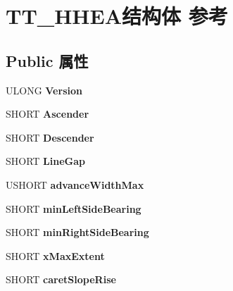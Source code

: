 \hypertarget{struct_t_t___h_h_e_a}{}\section{T\+T\+\_\+\+H\+H\+E\+A结构体 参考}
\label{struct_t_t___h_h_e_a}
\subsection*{Public 属性}
\begin{DoxyCompactItemize}
\item 
\mbox{\label{struct_t_t___h_h_e_a_aa05505bc2dbfb31e5d1ca99575117235}} 
U\+L\+O\+NG {\bfseries Version}
\item 
\mbox{\label{struct_t_t___h_h_e_a_ae5445ccf10168a3bcb59230cc2b16dd6}} 
S\+H\+O\+RT {\bfseries Ascender}
\item 
\mbox{\label{struct_t_t___h_h_e_a_ac67ecef4c132eb16403cd321e7b877a3}} 
S\+H\+O\+RT {\bfseries Descender}
\item 
\mbox{\label{struct_t_t___h_h_e_a_ab4bcb0aa017cf1fac9c29605d58df27b}} 
S\+H\+O\+RT {\bfseries Line\+Gap}
\item 
\mbox{\label{struct_t_t___h_h_e_a_a1d0ad53d8d77bb148c3cbeb66a2805a9}} 
U\+S\+H\+O\+RT {\bfseries advance\+Width\+Max}
\item 
\mbox{\label{struct_t_t___h_h_e_a_ab096904369a6c9ac0a6bb9c4cdf041e0}} 
S\+H\+O\+RT {\bfseries min\+Left\+Side\+Bearing}
\item 
\mbox{\label{struct_t_t___h_h_e_a_a5ca8613d86979ba5adf11b6d400e005d}} 
S\+H\+O\+RT {\bfseries min\+Right\+Side\+Bearing}
\item 
\mbox{\label{struct_t_t___h_h_e_a_a2656b631b409f8da3f2c56b4979861aa}} 
S\+H\+O\+RT {\bfseries x\+Max\+Extent}
\item 
\mbox{\label{struct_t_t___h_h_e_a_a97f1f59026672ac4293c2a62690c0825}} 
S\+H\+O\+RT {\bfseries caret\+Slope\+Rise}

\end{DoxyCompactItemize}
